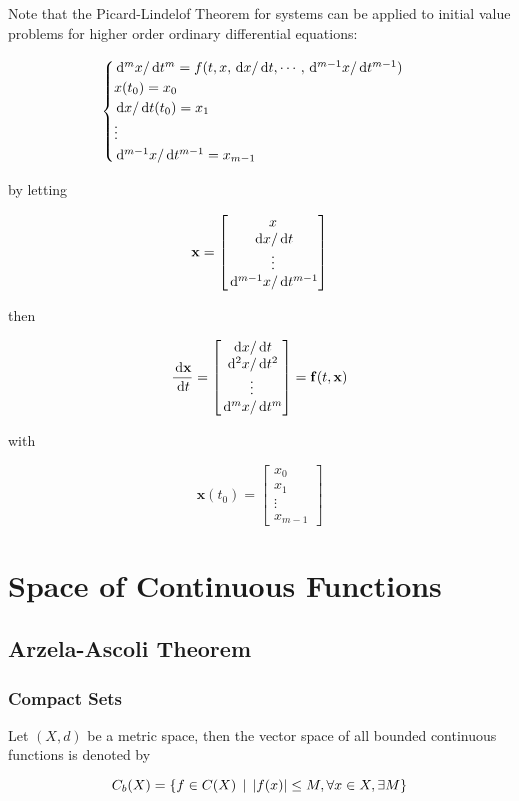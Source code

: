 \documentclass[a4paper,12pt]{article}
\begin{document}
Note that the Picard-Lindelof Theorem for systems can be applied to initial value problems for higher order ordinary differential equations:

$$\begin{cases}
  \,\mathrm{d}^{m}x/\,\mathrm{d} t^{m}=f(t,x,\,\mathrm{d} x/\,\mathrm{d} t,\cdots,\,\mathrm{d}^{m-1}x/\,\mathrm{d} t^{m-1})\\
  x(t_{0})=x_{0}\\
  \,\mathrm{d} x/\,\mathrm{d} t(t_{0})=x_{1}\\
  \vdots\\
  \,\mathrm{d}^{m-1}x/\,\mathrm{d} t^{m-1}=x_{m-1}
\end{cases}$$\s

by letting

$$\mathbf{x}=\begin{bmatrix}
  x\\
  \,\mathrm{d} x/\,\mathrm{d} t\\
  \vdots\\
  \,\mathrm{d}^{m-1}x/\,\mathrm{d} t^{m-1}
\end{bmatrix}$$\s

then

$$\frac{\,\mathrm{d}\mathbf{x}}{\,\mathrm{d} t}=\begin{bmatrix}
  \,\mathrm{d} x/\,\mathrm{d} t\\
  \,\mathrm{d}^{2}x/\,\mathrm{d} t^{2}\\
  \vdots\\
  \,\mathrm{d}^{m}x/\,\mathrm{d} t^{m}
\end{bmatrix}=\mathbf{f}(t,\mathbf{x})$$\s

with

$$\mathbf{x}(t_{0})=\begin{bmatrix}
  x_{0}\\
  x_{1}\\
  \vdots\\
  x_{m-1}
\end{bmatrix}$$

\pagebreak

\section{Space of Continuous Functions}
\subsection{Arzela-Ascoli Theorem}
\subsubsection{Compact Sets}
\begin{dft}
  Let $(X,d)$ be a metric space, then the vector space of all bounded continuous functions is denoted by

  $$C_{b}(X)=\left\{ f\in C(X)\,\mid\,\left| f(x)\right|\leq M,\forall x\in X,\exists M\right\}$$
\end{dft}\n
\end{document}
